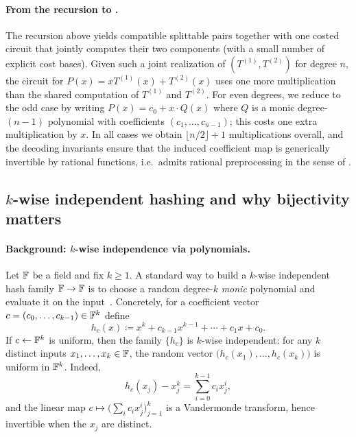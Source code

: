 \paragraph{From the recursion to .}
The recursion above yields compatible splittable pairs together with one
costed circuit that jointly computes their two components (with a small
number of explicit cost bases).
Given such a joint realization of $(T^{(1)},T^{(2)})$ for degree $n$, the
circuit for $P(x)=xT^{(1)}(x)+T^{(2)}(x)$ uses one more multiplication than
the shared computation of $T^{(1)}$ and $T^{(2)}$.
For even degrees, we reduce to the odd case by writing
\(
   P(x)=c_0 + x\cdot Q(x)
\)
where $Q$ is a monic degree-$(n-1)$ polynomial with coefficients $(c_1,\dots,c_{n-1})$; this costs one extra multiplication by $x$.
In all cases we obtain $\lfloor n/2\rfloor+1$ multiplications overall, and the decoding invariants ensure that the induced coefficient map is generically invertible by rational functions, i.e.\ admits rational preprocessing in the sense of .

\subsection{\texorpdfstring{$k$}{k}-wise independent hashing and why bijectivity matters}
\label{sec:main-theorem:kwise}

\paragraph{Background: $k$-wise independence via polynomials.}
Let $\mathbb{F}$ be a field and fix $k\ge 1$.
A standard way to build a $k$-wise independent hash family $\mathbb{F}\to\mathbb{F}$ is to choose a random
degree-$k$ \emph{monic} polynomial and evaluate it on the input~\cite{wegman1981new}.
Concretely, for a coefficient vector $c=(c_0,\dots,c_{k-1})\in\mathbb{F}^k$ define
\begin{equation}
  h_c(x) \coloneqq x^k + c_{k-1}x^{k-1} + \cdots + c_1 x + c_0.
  \label{eq:kwise:monic-poly}
\end{equation}
If $c\gets\mathbb{F}^k$ is uniform, then the family $\{h_c\}$ is $k$-wise independent:
for any $k$ distinct inputs $x_1,\dots,x_k\in\mathbb{F}$, the random vector
$\bigl(h_c(x_1),\dots,h_c(x_k)\bigr)$ is uniform in $\mathbb{F}^k$.
Indeed,
\[
  h_c(x_j) - x_j^k = \sum_{i=0}^{k-1} c_i x_j^i,
\]
and the linear map $c\mapsto \bigl(\sum_i c_i x_j^i\bigr)_{j=1}^k$ is a Vandermonde transform,
hence invertible when the $x_j$ are distinct.

